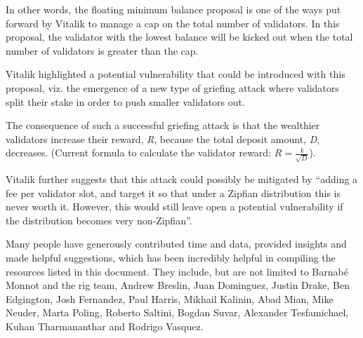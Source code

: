 \documentclass[UTF8]{article}
\begin{document}
In other words, the floating minimum balance proposal is one of the ways put forward by Vitalik to manage a cap on the total number of validators. In this proposal, the validator with the lowest balance will be kicked out when the total number of validators is greater than the cap. 

Vitalik highlighted a potential vulnerability that could be introduced with this proposal, viz. the emergence of a new type of griefing attack \cite{buterin2018c} where validators split their stake in order to push smaller validators out. 

The consequence of such a successful griefing attack is that the wealthier validators increase their reward, \textit{R}, because the total deposit amount, \textit{D}, decreases. (Current formula to calculate the validator reward: $R = \frac{k}{\sqrt{D}}$).

Vitalik further suggests that this attack could possibly be mitigated by ``adding a fee per validator slot, and target it so that under a Zipfian distribution this is never worth it. However, this would still leave open a potential vulnerability if the distribution becomes very non-Zipfian''. 

Many people have generously contributed time and data, provided insights and made helpful suggestions, which has been incredibly helpful in compiling the resources listed in this document. They include, but are not limited to Barnab\'e Monnot and the \gls{rig} team, Andrew Breslin, Juan Dominguez, Justin Drake,  Ben Edgington, Josh Fernandez, Paul Harris, Mikhail Kalinin, Abad Mian, Mike Neuder, Marta Poling, Roberto Saltini, Bogdan Suvar, Alexander Tesfamichael, Kuhan Tharmananthar and Rodrigo Vasquez.

\end{document}
